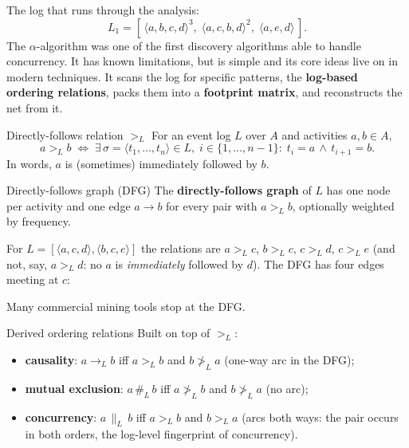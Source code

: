 The log that runs through the analysis:
\[
L_1 = [\,\langle a, b, c, d\rangle^3,\;\langle a, c, b, d\rangle^2,\;\langle a, e, d\rangle\,].
\]
The $\alpha$-algorithm was one of the first discovery algorithms able to handle concurrency. It has known limitations, but is simple and its core ideas live on in modern techniques. It scans the log for specific patterns, the \textbf{log-based ordering relations}, packs them into a \textbf{footprint matrix}, and reconstructs the net from it.

\begin{definitionbox}{Directly-follows relation $>_L$}
For an event log $L$ over $A$ and activities $a, b \in A$,
\[
  a >_L b \;\Longleftrightarrow\; \exists\, \sigma = \langle t_1, \dots, t_n\rangle \in L,\; i \in \{1, \dots, n-1\}:\; t_i = a \,\wedge\, t_{i+1} = b.
\]
In words, $a$ is (sometimes) immediately followed by $b$.
\end{definitionbox}

\begin{definitionbox}{Directly-follows graph (DFG)}
The \textbf{directly-follows graph} of $L$ has one node per activity and one edge $a \to b$ for every pair with $a >_L b$, optionally weighted by frequency.
\end{definitionbox}

For $L = [\langle a, c, d\rangle, \langle b, c, e\rangle]$ the relations are $a >_L c$, $b >_L c$, $c >_L d$, $c >_L e$ (and not, say, $a >_L d$: no $a$ is \emph{immediately} followed by $d$). The DFG has four edges meeting at $c$:
\begin{center}
\end{center}
Many commercial mining tools stop at the DFG.

\begin{definitionbox}{Derived ordering relations}
Built on top of $>_L$:
\begin{itemize}
  \item \textbf{causality}: $a \to_L b$ iff $a >_L b$ and $b \not>_L a$ (one-way arc in the DFG);
  \item \textbf{mutual exclusion}: $a \,\#_L\, b$ iff $a \not>_L b$ and $b \not>_L a$ (no arc);
  \item \textbf{concurrency}: $a \,\|_L\, b$ iff $a >_L b$ and $b >_L a$ (arcs both ways: the pair occurs in both orders, the log-level fingerprint of concurrency).
\end{itemize}
\end{definitionbox}

